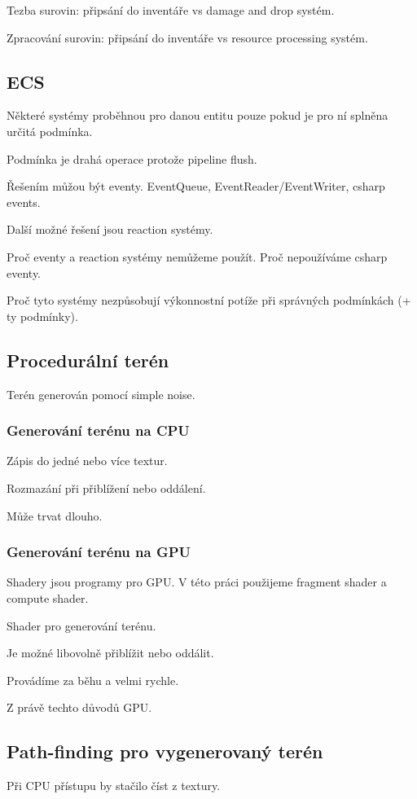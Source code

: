 Tezba surovin: připsání do inventáře vs damage and drop systém.

Zpracování surovin: připsání do inventáře vs resource processing systém. 

\subsection{ECS}
Některé systémy proběhnou pro danou entitu pouze pokud je pro ní splněna určitá podmínka.

Podmínka je drahá operace protože pipeline flush.

Řešením můžou být eventy. EventQueue, EventReader/EventWriter, csharp events.

Další možné řešení jsou reaction systémy.

Proč eventy a reaction systémy nemůžeme použít. Proč nepoužíváme csharp eventy.

Proč tyto systémy nezpůsobují výkonnostní potíže při správných podmínkách (+ ty podmínky).

\subsection{Procedurální terén}
Terén generován pomocí simple noise.

\subsubsection{Generování terénu na CPU}
Zápis do jedné nebo více textur.

Rozmazání při přiblížení nebo oddálení.

Může trvat dlouho.

\subsubsection{Generování terénu na GPU}
Shadery jsou programy pro GPU. V této práci použijeme fragment shader a compute shader.

Shader pro generování terénu.

Je možné libovolně přiblížit nebo oddálit.

Provádíme za běhu a velmi rychle.

Z právě techto důvodů GPU.

\subsection{Path-finding pro vygenerovaný terén}
Při CPU přístupu by stačilo číst z textury.

